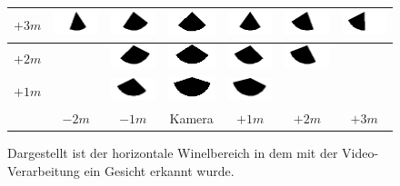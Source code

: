 \begin{figure}
\begin{tabular}{|c|c|c|c|c|c|c|}
		\hline 
		$+3m$ &
		\includegraphics[width=1.4cm]{PosWinkelVideo/Winkel_V_200_300.png}&
		\includegraphics[width=1.4cm]{PosWinkelVideo/Winkel_V_100_300.png}&
		\includegraphics[width=1.4cm]{PosWinkelVideo/Winkel_V_0_300.png}&
		\includegraphics[width=1.4cm]{PosWinkelVideo/Winkel_V_-100_300.png}&
		\includegraphics[width=1.4cm]{PosWinkelVideo/Winkel_V_-200_300.png}&
		\includegraphics[width=1.4cm]{PosWinkelVideo/Winkel_V_-300_300.png}\\ 
		\hline 
		$+2m$ & &
		\includegraphics[width=1.4cm]{PosWinkelVideo/Winkel_V_100_200.png}&
		\includegraphics[width=1.4cm]{PosWinkelVideo/Winkel_V_0_200.png}&
		\includegraphics[width=1.4cm]{PosWinkelVideo/Winkel_V_-100_200.png}&
		\includegraphics[width=1.4cm]{PosWinkelVideo/Winkel_V_-200_200.png} &\\ 
		\hline 
		$+1m$ & &
		\includegraphics[width=1.4cm]{PosWinkelVideo/Winkel_V_100_100.png}&
		\includegraphics[width=1.4cm]{PosWinkelVideo/Winkel_V_0_100.png}&
		\includegraphics[width=1.4cm]{PosWinkelVideo/Winkel_V_-100_100.png}& &\\ 
		\hline 
		& $-2m$ & $-1m$ &Kamera& $+1m$ & $+2m$ & $+3m$ \\ 
		\hline 
	\end{tabular}
	\caption{Dargestellt ist der horizontale Winelbereich in dem mit der Video-Verarbeitung ein Gesicht erkannt wurde.}
	\label{graph_Test_Video}
\end{figure}
